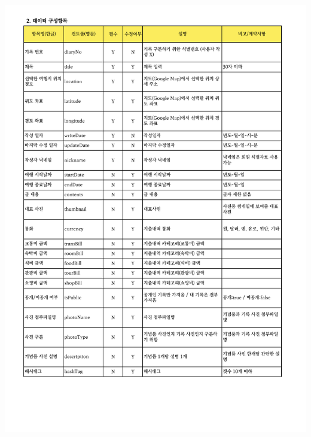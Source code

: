 {{{{{{{{{{{{{{{{{{{{{{{{{\includegraphics[width=20cm]{./Figure/Design/Display/diary/diary_07.pdf} \\
}}}}}}}}}}}}}}}}}}}}}}}}}
